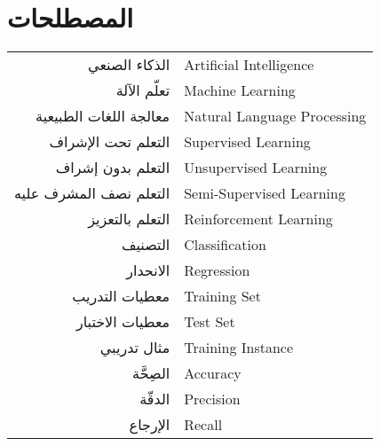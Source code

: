


\chapter*{\flushleft المصطلحات}

\begin{doublespacing}
	\begin{center}
		\begin{longtable}{r l}
			\indent
			
			الذكاء الصنعي 			&		 	\textenglish{Artificial Intelligence}			\\
			
			
			تعلّم الآلة	 			& 			\textenglish{Machine Learning}			\\
			
			
			معالجة اللغات الطبيعية		& 			\textenglish{Natural Language Processing}	\\
			
			
			التعلم تحت الإشراف		& 			\textenglish{Supervised Learning}	\\
			
			
			التعلم بدون إشراف		& 			\textenglish{Unsupervised Learning}	\\
			
			
			التعلم نصف المشرف عليه		& 			\textenglish{Semi-Supervised Learning}	\\
			
			
			التعلم بالتعزيز		& 			\textenglish{Reinforcement Learning}	\\
			
			
			التصنيف		& 			\textenglish{Classification}	\\
			
			
			الانحدار		& 			\textenglish{Regression}	\\
			
			معطيات التدريب		& 			\textenglish{Training Set}	\\
			
			معطيات الاختبار		& 			\textenglish{Test Set}	\\
			
			
			مثال تدريبي		& 			\textenglish{Training Instance}	\\
			
			
			الصِحَّة			& 			\textenglish{Accuracy}				\\
			
			الدقّة			& 			\textenglish{Precision}				\\
			
			الإرجاع			& 			\textenglish{Recall}				\\
			

\end{longtable}
\end{center}
\end{doublespacing}
